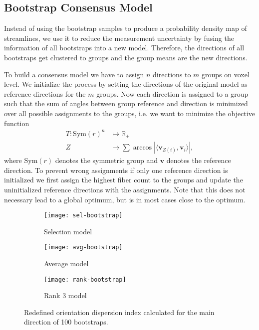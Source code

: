 \subsection{Bootstrap Consensus Model}
Instead of using the bootstrap samples to produce a probability density map of
streamlines, we use it to reduce the measurement uncertainty by fusing the
information of all bootstraps into a new model. 
Therefore, the directions of all bootstraps get clustered to groups and the
group means are the new directions.

To build a consensus model we have to assign $n$ directions to $m$ groups on voxel
level. We initialize the process by setting the directions of the original model
as reference directions for the $m$ groups. Now each
direction is assigned to a group such that the sum of angles between group
reference and direction is minimized over all possible assignments to the
groups, i.e. we want to minimize the objective function 
\begin{align}
	T : \text{Sym} \left( r \right)^n & \mapsto \mathbb{R}_+ \nonumber \\
	Z & \rightarrow \sum \arccos | \langle \mathbf{v}_{Z\left( i
	\right)}, \mathbf{v}_i \rangle | ,  
\end{align} 
where $\text{Sym}\left( r \right)$ denotes the symmetric group and $\mathbf{v}$ denotes
the reference direction. To prevent wrong assignments if only one reference
direction is initialized we first assign the highest fiber count to the
groups and update the uninitialized reference directions with the assignments.
Note that this does not necessary lead to a global optimum, but is in most cases
close to the optimum. 

\begin{figure*}[t]
	\centering
	\begin{subfigure}[b]{0.33\linewidth}
		\texttt{[image: sel-bootstrap]}
		\caption{Selection model}
	\end{subfigure}
	\begin{subfigure}[b]{0.33\linewidth}
		\texttt{[image: avg-bootstrap]}
		\caption{Average model}
	\end{subfigure}
	\begin{subfigure}[b]{0.33\linewidth}
		\texttt{[image: rank-bootstrap]}
		\caption{Rank 3 model}
	\end{subfigure}
	\caption{Redefined orientation dispersion index calculated for the main
	direction of 100 bootstraps.}
	\label{fig:dispersion}
\end{figure*}

